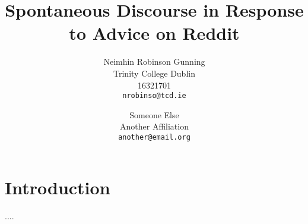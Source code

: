 \documentclass[a4paper,11pt]{article}
\title{Spontaneous Discourse in Response to Advice on Reddit}
\date{}
\author{Neimhin Robinson Gunning\\
       Trinity College Dublin\\
       16321701\\
       \texttt{nrobinso@tcd.ie}
  \and Someone Else\\
       Another Affiliation\\
       \texttt{another@email.org}
}
\begin{document}
\maketitle
\thispagestyle{empty}
\pagestyle{empty}

\section{Introduction}

....

\cite{alfandre-2009}

\cite{brookes-2016}

\cite{smailhodzic-2016}

\cite{proferes-2021}

\cite{atkins-2010}



\end{document}
